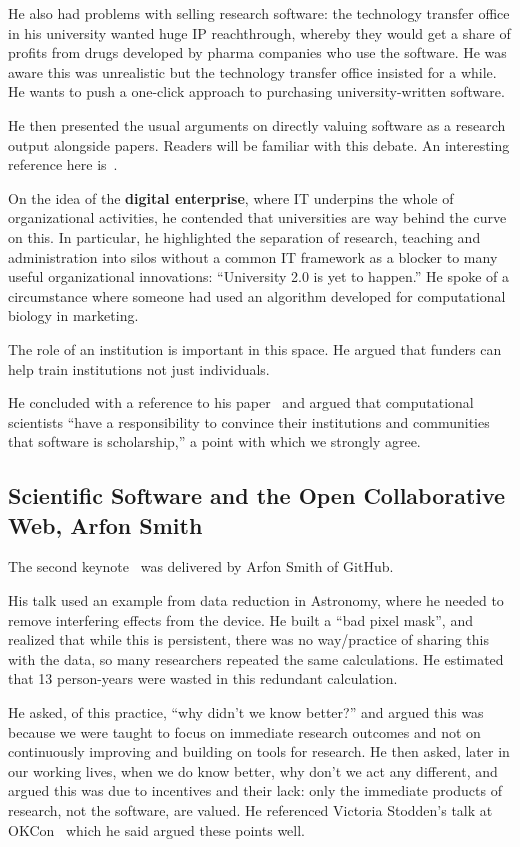 \documentclass[11pt, oneside]{amsart}
\begin{document}
He also had problems with selling research software: the technology
transfer office in his university wanted huge IP reachthrough, whereby
they would get a share of profits from drugs developed by pharma
companies who use the software. He was aware this was unrealistic but
the technology transfer office insisted for a while. He wants to push
a one-click approach to purchasing university-written software.

He then presented the usual arguments on directly valuing software as a
research output alongside papers. Readers will be familiar with this
debate. An interesting reference here is~\cite{peer-review-code}.

On the idea of the \textbf{digital enterprise}, where
IT underpins the whole of organizational activities, he contended that
universities are way behind the curve on this. In particular, he
highlighted the separation of research, teaching and administration into
silos without a common IT framework as a blocker to many useful
organizational innovations: ``University 2.0 is yet to happen.'' He
spoke of a circumstance where someone had used an algorithm developed
for computational biology in marketing.

The role of an institution is important in this space. He argued that
funders can help train institutions not just individuals.

He concluded with a reference to his paper~\cite{bourne_ten} and
argued that computational scientists ``have a responsibility to
convince their institutions and communities that software is
scholarship,'' a point with which we strongly agree.

\subsection{Scientific Software and the Open Collaborative Web, Arfon Smith}

The second keynote~\cite{WSSSPE1-keynote2} was delivered by
 Arfon Smith of GitHub.

His talk used an example from data reduction in Astronomy, where he
needed to remove interfering effects from the device. He built a ``bad
pixel mask'', and realized that while this is persistent, there was no
way/practice of sharing this with the data, so many researchers
repeated the same calculations. He estimated that 13 person-years were
wasted in this redundant calculation.

He asked, of this practice, ``why didn't we know better?'' and argued
this was because we were taught to focus on immediate research
outcomes and not on continuously improving and building on tools for
research. He then asked, later in our working lives, when we do know
better, why don't we act any different, and argued this was due to
incentives and their lack: only the immediate products of research,
not the software, are valued.  He referenced Victoria Stodden's talk
at OKCon~\cite{okcon-stodden-talk}
which he said argued these points well.
\end{document}
